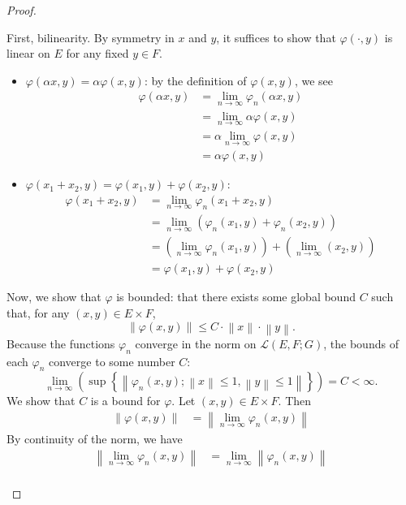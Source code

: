 \documentclass[12pt]{article}
\theoremstyle{definition}
\begin{document}
\begin{proof}
\begin{enumerate}[label=(\roman*)]
			\par First, bilinearity. By symmetry in $x$ and $y$, it suffices to show that $\varphi(\cdot, y)$ is linear on $E$ for any fixed $y \in F$. 
			\begin{itemize}
				\item $\varphi(\alpha x, y) = \alpha \varphi(x,y)$: by the definition of $\varphi(x,y)$, we see
					\begin{align*}
						\varphi(\alpha x, y) &= \lim_{n \to \infty} \varphi_n(\alpha x, y)\\
						&= \lim_{n \to \infty } \alpha \varphi(x, y)\\
						&= \alpha \lim_{ n \to \infty} \varphi(x,y)\\
						&= \alpha \varphi(x,y)
					\end{align*}
				\item $\varphi(x_1 + x_2, y) = \varphi(x_1, y) + \varphi(x_2, y)$:
					\begin{align*}
						\varphi(x_1 + x_2, y) &= \lim_{n \to \infty} \varphi_n(x_1 + x_2, y)\\
						&= \lim_{n \to \infty }\left( \varphi_n(x_1, y) + \varphi_n(x_2, y) \right)\\
						&= \left( \lim_{n \to \infty} \varphi_n(x_1, y) \right) + \left( \lim_{n \to \infty}(x_2, y) \right)\\
						&= \varphi(x_1, y) + \varphi(x_2, y)
					\end{align*}
			\end{itemize}
			Now, we show that $\varphi$ is bounded: that there exists some global bound $C$ such that, for any $(x,y) \in E \times F$, 
			\[ \left \lVert { \varphi(x,y) } \right \lVert \leq C \cdot \left \lVert {  x } \right \lVert  \cdot \left \lVert { y } \right \lVert. \]
			Because the functions $\varphi_n$ converge in the norm on $\mathcal L(E,F;G)$, the bounds of each $\varphi_n$ converge to some number $C$:
			\[ \lim_{n \to \infty} \left( \sup\left\{ \left \lVert { \varphi_n(x,y); \left \lVert {  x } \right \lVert \leq 1, \left \lVert { y } \right \lVert \leq 1 } \right \lVert  \right\} \right) = C < \infty. \]
			We show that $C$ is a bound for $\varphi$. Let $(x,y) \in E \times F$. Then
			\begin{align*}
				\left \lVert { \varphi(x,y) } \right \lVert &= \left \lVert { \lim_{n\to \infty} \varphi_n(x,y) } \right \lVert 
			\end{align*}
			By continuity of the norm, we have
			\begin{align*}
				\left \lVert { \lim_{n \to \infty} \varphi_n(x,y) } \right \lVert &= \lim_{n \to \infty} \left \lVert { \varphi_n(x,y) } \right \lVert \\

\end{align*}
\end{enumerate}
\end{proof}
\end{document}
